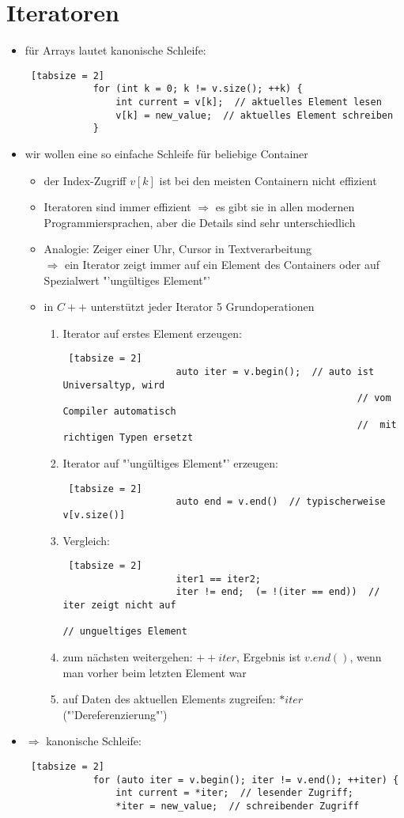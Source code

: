 \documentclass{article}
\begin{document}
	 \section{Iteratoren}
	\begin{itemize}
		\item für Arrays lautet kanonische Schleife:
		\begin{lstlisting} [tabsize = 2]
			for (int k = 0; k != v.size(); ++k) {
				int current = v[k];  // aktuelles Element lesen
				v[k] = new_value;  // aktuelles Element schreiben
			}
		\end{lstlisting}
		\item wir wollen eine so einfache Schleife für beliebige Container
		\begin{itemize}
			\item der Index-Zugriff $v[k]$ ist bei den meisten Containern nicht effizient
			\item Iteratoren sind immer effizient $\Rightarrow$ es gibt sie in allen modernen Programmiersprachen, aber die Details sind sehr unterschiedlich
			\item Analogie: Zeiger einer Uhr, Cursor in Textverarbeitung \\
			$\Rightarrow$ ein Iterator zeigt immer auf ein Element des Containers oder auf Spezialwert "'ungültiges Element"'
			\item in $C++$ unterstützt jeder Iterator 5 Grundoperationen
			\begin{enumerate}
				\item Iterator auf erstes Element erzeugen:
				\begin{lstlisting} [tabsize = 2]
					auto iter = v.begin();  // auto ist Universaltyp, wird 
													// vom Compiler automatisch
													//  mit richtigen Typen ersetzt
				\end{lstlisting}
				\item Iterator auf "'ungültiges Element"' erzeugen:
				\begin{lstlisting} [tabsize = 2]
					auto end = v.end()  // typischerweise v[v.size()]
				\end{lstlisting}
				\item Vergleich:
				\begin{lstlisting} [tabsize = 2]
					iter1 == iter2;
					iter != end;  (= !(iter == end))  // iter zeigt nicht auf
																  // ungueltiges Element
				\end{lstlisting}
				\item zum nächsten weitergehen: $++iter$, Ergebnis ist $v.end()$, wenn man vorher beim letzten Element war
				\item auf Daten des aktuellen Elements zugreifen: $*iter$ ("'Dereferenzierung"')
			\end{enumerate}
		\end{itemize}
		\item $\Rightarrow$ kanonische Schleife:
		\begin{lstlisting} [tabsize = 2]
			for (auto iter = v.begin(); iter != v.end(); ++iter) {
				int current = *iter;  // lesender Zugriff;
				*iter = new_value;  // schreibender Zugriff
				

\end{lstlisting}
\end{itemize}
\end{document}
